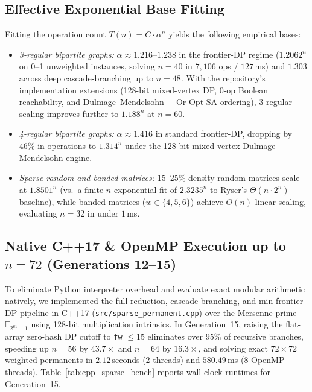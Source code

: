 \documentclass[11pt,a4paper]{article}
\theoremstyle{definition}
\newcommand{\F}{\mathbb{F}}
\begin{document}
\subsection{Effective Exponential Base Fitting}

Fitting the operation count $T(n) = C \cdot \alpha^n$ yields the following empirical bases:
\begin{itemize}[leftmargin=*]
    \item \emph{3-regular bipartite graphs:} $\alpha \approx 1.216$--$1.238$ in the frontier-DP regime ($1.2062^n$ on 0--1 unweighted instances, solving $n = 40$ in $7{,}106$ ops / $127$\,ms) and $1.303$ across deep cascade-branching up to $n = 48$. With the repository's implementation extensions (128-bit mixed-vertex DP, 0-op Boolean reachability, and Dulmage--Mendelsohn + Or-Opt SA ordering), 3-regular scaling improves further to $1.188^n$ at $n = 60$.
    \item \emph{4-regular bipartite graphs:} $\alpha \approx 1.416$ in standard frontier-DP, dropping by $46\%$ in operations to $1.314^n$ under the 128-bit mixed-vertex Dulmage--Mendelsohn engine.
    \item \emph{Sparse random and banded matrices:} 15--25\% density random matrices scale at $1.8501^n$ (vs.\ a finite-$n$ exponential fit of $2.3235^n$ to Ryser's $\Theta(n \cdot 2^n)$ baseline), while banded matrices ($w \in \{4,5,6\}$) achieve $O(n)$ linear scaling, evaluating $n = 32$ in under $1$\,ms.
\end{itemize}

\subsection{Native C++17 \& OpenMP Execution up to $n = 72$ (Generations 12--15)}

To eliminate Python interpreter overhead and evaluate exact modular arithmetic natively, we implemented the full reduction, cascade-branching, and min-frontier DP pipeline in C++17 (\texttt{src/sparse\_\-permanent.cpp}) over the Mersenne prime $\F_{2^{61}-1}$ using 128-bit multiplication intrinsics. In Generation~15, raising the flat-array zero-hash DP cutoff to \texttt{fw} $\le 15$ eliminates over $95\%$ of recursive branches, speeding up $n = 56$ by $43.7\times$ and $n = 64$ by $16.3\times$, and solving exact $72 \times 72$ weighted permanents in $2.12$\,seconds (2 threads) and $580.49$\,ms (8 OpenMP threads). Table~\ref{tab:cpp_sparse_bench} reports wall-clock runtimes for Generation~15.
\end{document}
